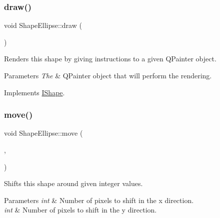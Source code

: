 \mbox{\label{class_shape_ellipse_ac7f0a33cb5a88c6956f2d876c0c5d313}} 
\subsubsection{\texorpdfstring{draw()}{draw()}}
{\footnotesize\ttfamily void Shape\+Ellipse\+::draw (\begin{DoxyParamCaption}\item[{Q\+Painter \&}]{ }\end{DoxyParamCaption})\hspace{0.3cm}{\ttfamily [virtual]}}



Renders this shape by giving instructions to a given Q\+Painter object. 


\begin{DoxyParams}{Parameters}
{\em The} & Q\+Painter object that will perform the rendering. \\
\hline
\end{DoxyParams}


Implements \mbox{\hyperlink{class_i_shape_ad97c626e7e2c9afb9f51efc41b836e6f}{I\+Shape}}.

\mbox{\label{class_shape_ellipse_a07ce6783744d01ccebbd5c2c8b4c7d9b}} 
\subsubsection{\texorpdfstring{move()}{move()}}
{\footnotesize\ttfamily void Shape\+Ellipse\+::move (\begin{DoxyParamCaption}\item[{int}]{,  }\item[{int}]{ }\end{DoxyParamCaption})\hspace{0.3cm}{\ttfamily [virtual]}}



Shifts this shape around given integer values. 


\begin{DoxyParams}{Parameters}
{\em int} & Number of pixels to shift in the x direction. \\
\hline
{\em int} & Number of pixels to shift in the y direction. \\
\hline
\end{DoxyParams}


